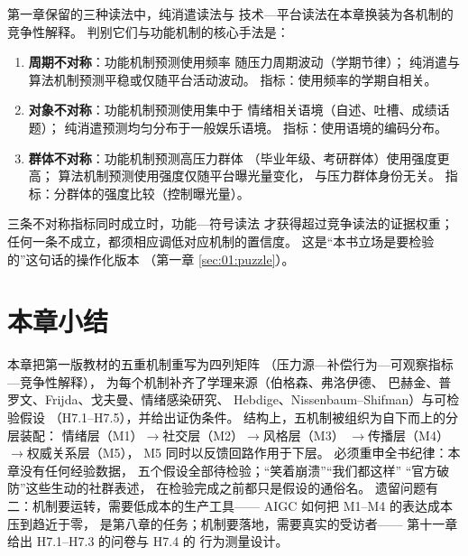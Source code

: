 第一章保留的三种读法中，纯消遣读法与
技术—平台读法在本章换装为各机制的竞争性解释。
判别它们与功能机制的核心手法是：

\begin{enumerate}[label=\arabic*.]
  \item \textbf{周期不对称}：功能机制预测使用频率
        随压力周期波动（学期节律）；
        纯消遣与算法机制预测平稳或仅随平台活动波动。
        指标：使用频率的学期自相关。
  \item \textbf{对象不对称}：功能机制预测使用集中于
        情绪相关语境（自述、吐槽、成绩话题）；
        纯消遣预测均匀分布于一般娱乐语境。
        指标：使用语境的编码分布。
  \item \textbf{群体不对称}：功能机制预测高压力群体
        （毕业年级、考研群体）使用强度更高；
        算法机制预测使用强度仅随平台曝光量变化，
        与压力群体身份无关。
        指标：分群体的强度比较（控制曝光量）。
\end{enumerate}

三条不对称指标同时成立时，功能—符号读法
才获得超过竞争读法的证据权重；
任何一条不成立，都须相应调低对应机制的置信度。
这是“本书立场是要检验的”这句话的操作化版本
（第一章 \ref{sec:01:puzzle}）。

\section{本章小结}\label{sec:07:summary}

本章把第一版教材的五重机制重写为四列矩阵
（压力源—补偿行为—可观察指标—竞争性解释），
为每个机制补齐了学理来源（伯格森、弗洛伊德、
巴赫金、普罗文、Frijda、戈夫曼、情绪感染研究、
Hebdige、Nissenbaum--Shifman）与可检验假设
（H7.1--H7.5），并给出证伪条件。
结构上，五机制被组织为自下而上的分层装配：
情绪层（M1）$\to$社交层（M2）$\to$风格层（M3）
$\to$传播层（M4）$\to$权威关系层（M5），
M5 同时以反馈回路作用于下层。
必须重申全书纪律：本章没有任何经验数据，
五个假设全部待检验；“笑着崩溃”“我们都这样”
“官方破防”这些生动的社群表述，
在检验完成之前都只是假设的通俗名。
遗留问题有二：机制要运转，需要低成本的生产工具——
AIGC 如何把 M1--M4 的表达成本压到趋近于零，
是第八章的任务；机制要落地，需要真实的受访者——
第十一章给出 H7.1--H7.3 的问卷与 H7.4 的
行为测量设计。

